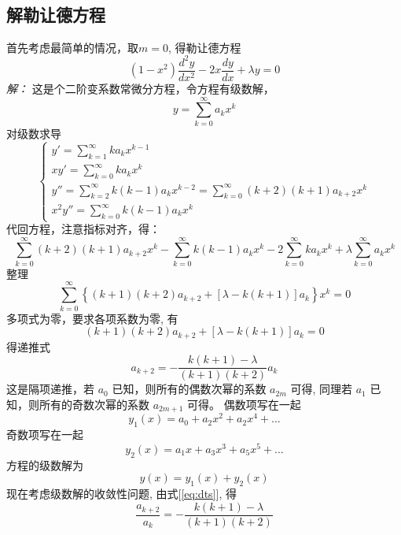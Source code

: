 	~~\\ 
	
	
	\subsection{解勒让德方程}
	首先考虑最简单的情况，取$m=0$, 得勒让德方程
		\begin{equation}
			\boxed{\left(1-x^{2}\right) \frac{d^{2} y}{d x^{2}}-2 x \frac{d y}{d x}+\lambda y=0} 
		\end{equation}
	\emph{解：}	
		这是个二阶变系数常微分方程，令方程有级数解，
		\[ y=\sum_{k=0}^{\infty} a_k x ^k \]
		对级数求导
	$$\begin{cases}
			y' = \sum\limits_{k=1}^{\infty} k a_k x^{k-1} \\
			xy'= \sum\limits_{k=0}^{\infty} k a_k x^{k}
			\\
			y'' = \sum\limits_{k=2}^{\infty} k (k-1) a_k x^{k-2} =  \sum\limits_{k=0}^{\infty} (k+2) (k+1) a_{k+2} x^k \\
			x^{2}y'' =  \sum\limits_{k=0}^{\infty} k (k-1) a_k x^{k}
		\end{cases}$$
		代回方程，注意指标对齐，得：
		\[ \sum\limits_{k=0}^{\infty} (k+2) (k+1) a_{k+2} x^k - \sum\limits_{k=0}^{\infty} k (k-1) a_k x^{k} -2\sum\limits_{k=0}^{\infty} k a_k x^{k} + \lambda \sum_{k=0}^{\infty} a_k x ^k \]
		整理
		\begin{equation*}
			\sum_{k=0}^{\infty}\left\{(k+1)(k+2) a_{k+2}+[\lambda-k(k+1)] a_{k}\right\} x^{k}=0
		\end{equation*}	
		多项式为零，要求各项系数为零, 有
		\begin{equation*}
			(k+1)(k+2) a_{k+2}+[\lambda-k(k+1)] a_{k}=0
		\end{equation*}	
		得递推式
		\begin{equation} \label{eq:dts}
			a_{k+2}=-\frac{k(k+1)-\lambda}{(k+1)(k+2) }a_{k}
		\end{equation}
		这是隔项递推，若 $a_0$ 已知，则所有的偶数次幂的系数 $a_{2m}$ 可得, 同理若 $a_1$ 已知，则所有的奇数次幂的系数 $a_{2m+1}$ 可得。
		偶数项写在一起
		\begin{equation*}
			y_{1}(x)= a_{0} + a_{2} x^2 + a_{2} x^4 +...  
		\end{equation*}	
		奇数项写在一起
		\begin{equation*}
			y_{2}(x)= a_{1} x+ a_{3} x^3 + a_{5} x^5 +... 
		\end{equation*}
		方程的级数解为\[ y(x)=  y_{1}(x) +  y_{2}(x) \]
		现在考虑级数解的收敛性问题, 由式[\ref{eq:dts}], 得
		\[ \frac{a_{k+2}}{a_{k}} = -\frac{k(k+1)-\lambda}{(k+1)(k+2) }\]
